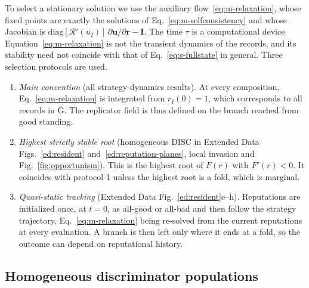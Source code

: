 \documentclass[10pt]{wlscirep}
\newcommand{\Rmap}{\mathscr{R}}            %
\theoremstyle{plain}
\theoremstyle{remark}
\begin{document}
To select a stationary solution we use the auxiliary flow~\eqref{eq:m-relaxation}, whose fixed points are exactly the solutions of Eq.~\eqref{eq:m-selfconsistency} and whose Jacobian is $\mathrm{diag}[\Rmap'(u_I)]\,\partial\bm u/\partial\bm r-\mathbf I$. The time $\tau$ is a computational device. Equation~\eqref{eq:m-relaxation} is not the transient dynamics of the records, and its stability need not coincide with that of Eq.~\eqref{eq:s-fullstate} in general. Three selection protocols are used.
\begin{enumerate}
\item \textit{Main convention} (all strategy-dynamics results). At every composition, Eq.~\eqref{eq:m-relaxation} is integrated from $r_I(0)=1$, which corresponds to all records in G. The replicator field is thus defined on the branch reached from good standing.
\item \textit{Highest strictly stable root} (homogeneous DISC in Extended Data Figs.~\ref{ed:resident} and~\ref{ed:reputation-planes}, local invasion and Fig.~\ref{fig:opportunism}). This is the highest root of $F(r)$ with $F'(r)<0$. It coincides with protocol 1 unless the highest root is a fold, which is marginal.
\item \textit{Quasi-static tracking} (Extended Data Fig.~\ref{ed:resident}e--h). Reputations are initialized once, at $t=0$, as all-good or all-bad and then follow the strategy trajectory, Eq.~\eqref{eq:m-relaxation} being re-solved from the current reputations at every evaluation. A branch is then left only where it ends at a fold, so the outcome can depend on reputational history.
\end{enumerate}

\subsection{Homogeneous discriminator populations}
\label{si:resident}
\end{document}
